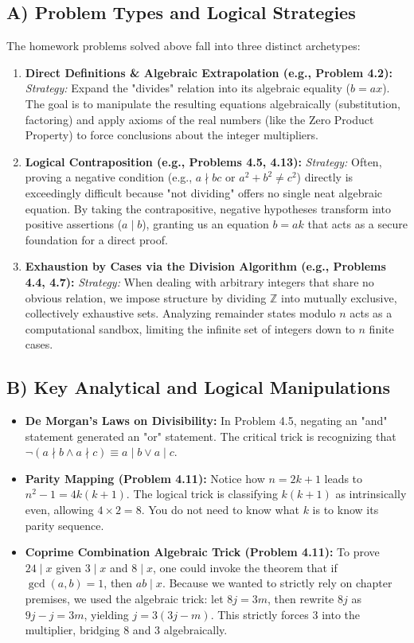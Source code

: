 \documentclass[11pt]{article}
\theoremstyle{definition}
\theoremstyle{remark}
\begin{document}
\subsection{A) Problem Types and Logical Strategies}
The homework problems solved above fall into three distinct archetypes:
\begin{enumerate}
    \item \textbf{Direct Definitions \& Algebraic Extrapolation (e.g., Problem 4.2):}
    \textit{Strategy:} Expand the "divides" relation into its algebraic equality ($b = ax$). The goal is to manipulate the resulting equations algebraically (substitution, factoring) and apply axioms of the real numbers (like the Zero Product Property) to force conclusions about the integer multipliers.
    \item \textbf{Logical Contraposition (e.g., Problems 4.5, 4.13):}
    \textit{Strategy:} Often, proving a negative condition (e.g., $a \nmid bc$ or $a^2+b^2 \neq c^2$) directly is exceedingly difficult because "not dividing" offers no single neat algebraic equation. By taking the contrapositive, negative hypotheses transform into positive assertions ($a \mid b$), granting us an equation $b = ak$ that acts as a secure foundation for a direct proof.
    \item \textbf{Exhaustion by Cases via the Division Algorithm (e.g., Problems 4.4, 4.7):}
    \textit{Strategy:} When dealing with arbitrary integers that share no obvious relation, we impose structure by dividing $\mathbb{Z}$ into mutually exclusive, collectively exhaustive sets. Analyzing remainder states modulo $n$ acts as a computational sandbox, limiting the infinite set of integers down to $n$ finite cases.
\end{enumerate}

\subsection{B) Key Analytical and Logical Manipulations}
\begin{itemize}
    \item \textbf{De Morgan's Laws on Divisibility:} In Problem 4.5, negating an "and" statement generated an "or" statement. The critical trick is recognizing that $\neg(a \nmid b \land a \nmid c) \equiv a \mid b \lor a \mid c$.
    \item \textbf{Parity Mapping (Problem 4.11):} Notice how $n = 2k+1$ leads to $n^2 - 1 = 4k(k+1)$. The logical trick is classifying $k(k+1)$ as intrinsically even, allowing $4 \times 2 = 8$. You do not need to know what $k$ is to know its parity sequence.
    \item \textbf{Coprime Combination Algebraic Trick (Problem 4.11):} To prove $24 \mid x$ given $3 \mid x$ and $8 \mid x$, one could invoke the theorem that if $\gcd(a,b)=1$, then $ab \mid x$. Because we wanted to strictly rely on chapter premises, we used the algebraic trick: let $8j = 3m$, then rewrite $8j$ as $9j - j = 3m$, yielding $j = 3(3j-m)$. This strictly forces $3$ into the multiplier, bridging $8$ and $3$ algebraically.
\end{itemize}
\end{document}
